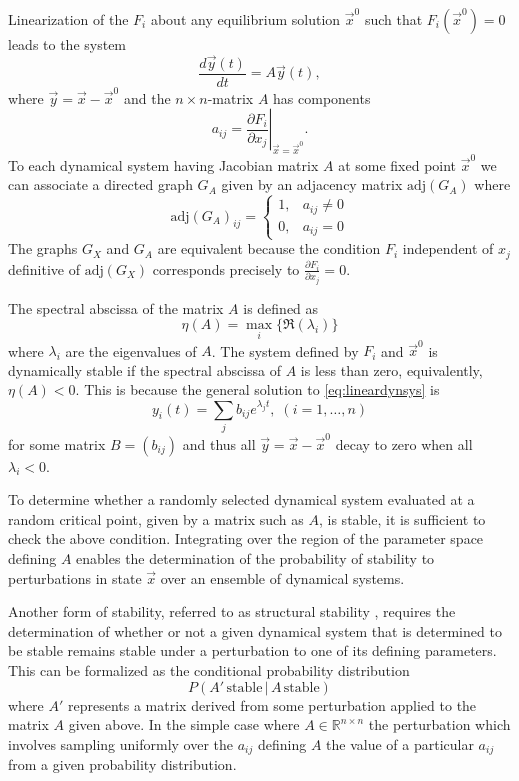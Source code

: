 \documentclass{amsart}
\theoremstyle{definition}
\theoremstyle{remark}
\numberwithin{equation}{section}
\def\adj{\mathrm{adj}}
\begin{document}
Linearization of the $F_i$ about any equilibrium solution $\vec{x}^0$ such that $F_i(\vec{x}^0)=0$ leads to the system
\begin{equation}\label{eq:lineardynsys}
\frac{d\vec{y}(t)}{dt} = A \vec{y}(t),
\end{equation}
where $\vec{y} = \vec{x} - \vec{x}^0$ and the $n \times n$-matrix $A$ has components
$$
a_{ij} = \left. \frac{\partial F_i}{\partial x_j} \right|_{\vec{x} = \vec{x}^0}.
$$
To each dynamical system having Jacobian matrix $A$ at some fixed point $\vec{x}^0$ we can associate a directed graph $G_A$ given by an adjacency matrix $\adj(G_A)$ where
 \begin{displaymath}
   \adj(G_A)_{ij} = \left\{
     \begin{array}{lr}
       1, & a_{ij} \neq 0\\
       0, & a_{ij} = 0
     \end{array}
   \right.
\end{displaymath}
The graphs $G_X$ and $G_A$ are equivalent because the condition $F_i$ independent of $x_j$ definitive of $\adj(G_X)$ corresponds precisely to $\frac{\partial F_i}{\partial x_j}=0$.

The spectral abscissa of the matrix $A$ is defined as
$$
\eta(A) = \max_i \{\Re(\lambda_i)\}
$$
where $\lambda_i$ are the eigenvalues of $A$. The system defined by $F_i$ and $\vec{x}^0$ is dynamically stable if the spectral abscissa of $A$ is less than zero, equivalently, $\eta(A) < 0$. This is because the general solution to \ref{eq:lineardynsys} is
$$
y_i(t) = \sum_j b_{ij} e^{\lambda_j t}, \; (i=1,\ldots,n)
$$
for some matrix $B=(b_{ij})$ and thus all $\vec{y} = \vec{x} - \vec{x}^0$ decay to zero when all $\lambda_i < 0$.

To determine whether a randomly selected dynamical system evaluated at a random critical point, given by a matrix such as $A$, is stable, it is sufficient to check the above condition. Integrating over the region of the parameter space defining $A$ enables the determination of the probability of stability to perturbations in state $\vec{x}$ over an ensemble of dynamical systems.

Another form of stability, referred to as structural stability \cite{Smale1967}, requires the determination of whether or not a given dynamical system that is determined to be stable remains stable under a perturbation to one of its defining parameters. This can be formalized as the conditional probability distribution
$$
P(A' \, \textrm{stable}\, \big| \, A \, \textrm{stable})
$$
where $A'$ represents a matrix derived from some perturbation applied to the matrix $A$ given above. In the simple case where $A \in \mathbb{R}^{n \times n}$ the perturbation which involves sampling uniformly over the $a_{ij}$ defining $A$ the value of a particular $a_{ij}$ from a given probability distribution.
\end{document}
